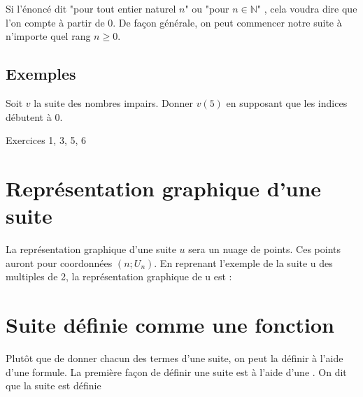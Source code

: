 \documentclass[a4paper,12pt]{article}
\begin{document}
Si l’énoncé dit "pour tout entier naturel $n$" ou "pour $n \in \mathbb{N}$" , cela voudra dire que l’on compte à partir de 0.
De façon générale, on peut commencer notre suite à n’importe quel rang $n \geq 0$.

\subsection*{Exemples}

Soit $v$ la suite des nombres impairs. Donner $v(5)$ en supposant que les indices débutent à 0. \par
\vspace{1em}
{\vspace{2em}}


\begin{tcolorbox}[colback=blue!10!white, colframe=blue!75!black, title=Exercices]
  Exercices 1, 3, 5, 6
\end{tcolorbox}

\section*{Représentation graphique d'une suite}
\vspace{1em}

La représentation graphique d’une suite $u$ sera un nuage de points. Ces points auront pour coordonnées $(n ; U_n)$.
En reprenant l’exemple de la suite u des multiples de 2, la représentation graphique de u est :

{\vspace{7em}}

\section*{Suite définie comme une fonction}
\vspace{1em}

Plutôt que de donner chacun des termes d’une suite, on peut la définir à l’aide d’une formule. La première façon de définir une suite est à l’aide d’une .
On dit que la suite est définie 
\end{document}
